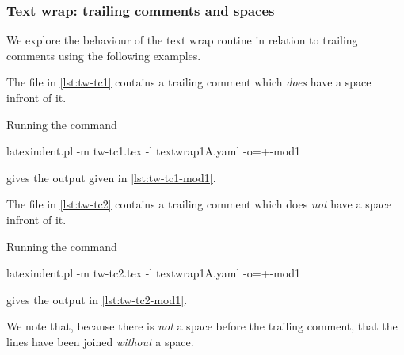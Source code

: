 \documentclass[10pt]{article}
\begin{document}
\subsubsection{Text wrap: trailing comments and spaces}
 We explore the behaviour of the text wrap routine in relation to trailing comments using
 the following examples.

 \begin{example}
 The file in \cref{lst:tw-tc1} contains a trailing comment which \emph{does} have a space
 infront of it.

 Running the command

 \begin{commandshell}
latexindent.pl -m tw-tc1.tex -l textwrap1A.yaml -o=+-mod1 
\end{commandshell}

 gives the output given in \cref{lst:tw-tc1-mod1}.

 \begin{cmhtcbraster}[raster column skip=.1\linewidth]
 \end{cmhtcbraster}
 \end{example}

 \begin{example}
 The file in \cref{lst:tw-tc2} contains a trailing comment which does \emph{not} have a
 space infront of it.

 Running the command

 \begin{commandshell}
latexindent.pl -m tw-tc2.tex -l textwrap1A.yaml -o=+-mod1 
\end{commandshell}

 gives the output in \cref{lst:tw-tc2-mod1}.
 \begin{cmhtcbraster}[raster column skip=.1\linewidth]
 \end{cmhtcbraster}
 We note that, because there is \emph{not} a space before the trailing comment, that the
 lines have been joined \emph{without} a space.
 \end{example}
\end{document}
